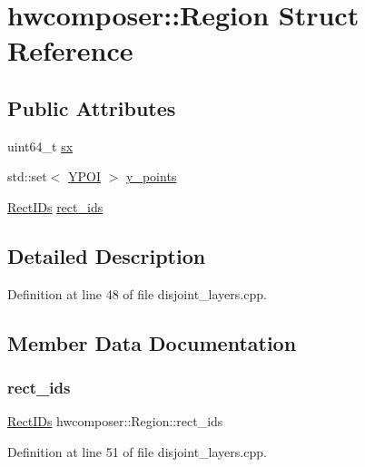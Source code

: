 \hypertarget{structhwcomposer_1_1Region}{}\section{hwcomposer\+:\+:Region Struct Reference}
\label{structhwcomposer_1_1Region}
\subsection*{Public Attributes}
\begin{DoxyCompactItemize}
\item 
uint64\+\_\+t \mbox{\hyperlink{structhwcomposer_1_1Region_aaebe8b3c84beac9b673e16da0538da00}{sx}}
\item 
std\+::set$<$ \mbox{\hyperlink{structhwcomposer_1_1YPOI}{Y\+P\+OI}} $>$ \mbox{\hyperlink{structhwcomposer_1_1Region_a4e531e0e48c6299ae312397c9d4eeea7}{y\+\_\+points}}
\item 
\mbox{\hyperlink{structhwcomposer_1_1RectIDs}{Rect\+I\+Ds}} \mbox{\hyperlink{structhwcomposer_1_1Region_ab5d133570f0a2acb9b3f20ac6297b133}{rect\+\_\+ids}}
\end{DoxyCompactItemize}


\subsection{Detailed Description}


Definition at line 48 of file disjoint\+\_\+layers.\+cpp.



\subsection{Member Data Documentation}
\mbox{\label{structhwcomposer_1_1Region_ab5d133570f0a2acb9b3f20ac6297b133}} 
\subsubsection{\texorpdfstring{rect\+\_\+ids}{rect\_ids}}
{\footnotesize\ttfamily \mbox{\hyperlink{structhwcomposer_1_1RectIDs}{Rect\+I\+Ds}} hwcomposer\+::\+Region\+::rect\+\_\+ids}



Definition at line 51 of file disjoint\+\_\+layers.\+cpp.

